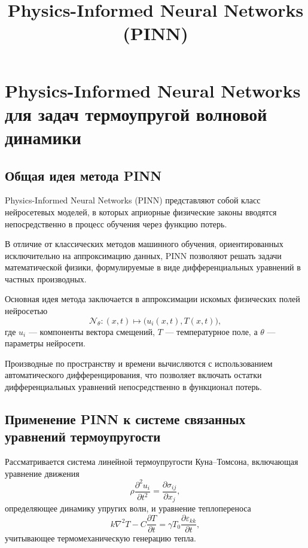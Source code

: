\documentclass[12pt]{article}
\title{Physics-Informed Neural Networks (PINN)}
\author{}
\date{}
\begin{document}
\section{Physics-Informed Neural Networks для задач термоупругой волновой динамики}

\subsection{Общая идея метода PINN}

Physics-Informed Neural Networks (PINN) представляют собой класс нейросетевых моделей, в которых априорные физические законы вводятся непосредственно в процесс обучения через функцию потерь. 

В отличие от классических методов машинного обучения, ориентированных исключительно на аппроксимацию данных, PINN позволяют решать задачи математической физики, формулируемые в виде дифференциальных уравнений в частных производных.

Основная идея метода заключается в аппроксимации искомых физических полей нейросетью
\begin{equation}
\mathcal{N}_\theta : (x,t) \mapsto \bigl( u_i(x,t), T(x,t) \bigr),
\end{equation}
где $u_i$ — компоненты вектора смещений, $T$ — температурное поле, а $\theta$ — параметры нейросети.

Производные по пространству и времени вычисляются с использованием автоматического дифференцирования, что позволяет включать остатки дифференциальных уравнений непосредственно в функционал потерь.

\subsection{Применение PINN к системе связанных уравнений термоупругости}

Рассматривается система линейной термоупругости Куна–Томсона, включающая уравнение движения
\begin{equation}
\rho \frac{\partial^2 u_i}{\partial t^2} = \frac{\partial \sigma_{ij}}{\partial x_j},
\end{equation}
определяющее динамику упругих волн, и уравнение теплопереноса
\begin{equation}
k \nabla^2 T - C \frac{\partial T}{\partial t} = \gamma T_0 \frac{\partial \varepsilon_{kk}}{\partial t},
\end{equation}
учитывающее термомеханическую генерацию тепла.
\end{document}
